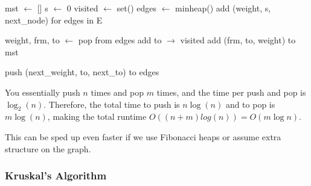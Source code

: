   \begin{algo}
    \begin{algorithm}[H]
      \label{alg:prims}
      \begin{algorithmic}[1]
          \State mst $\gets$ [] 
          \State s $\gets$ 0 
          \State visited $\gets$ set() 
          \State edges $\gets$ minheap() 
          \State add (weight, s, next\_node) for edges in E 

           
            \State weight, frm, to $\gets$ pop from edges 
             
              \State add to $\rightarrow$ visited 
              \State add (frm, to, weight) to mst 

               
                 
                  \State push (next\_weight, to, next\_to) to edges
                \EndIf
              \EndFor
            \EndIf
          \EndWhile 

          \State {} 
        \EndFunction
      \end{algorithmic}
    \end{algorithm}

    You essentially push $n$ times and pop $m$ times, and the time per push and pop is $\log_2 (n)$. Therefore, the total time to push is $n \log(n)$ and to pop is $m \log (n)$, making the total runtime $O((n + m) log(n)) = O(m \log{n})$. 
  \end{algo}

  This can be sped up even faster if we use Fibonacci heaps or assume extra structure on the graph. 

\subsubsection{Kruskal's Algorithm}

